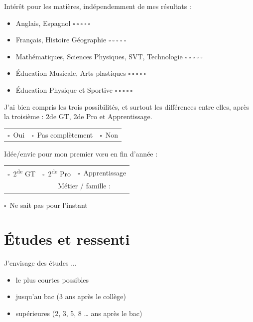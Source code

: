 \documentclass[11pt,a5paper]{article}
\newcommand{\checkbox}{\(\square\)}
\newcommand{\choix}[1]{\checkbox\ #1}
\newcommand{\ligne}{{\color{gray!60}\hrulefill}}
\begin{document}
\vspace{0.6em}
Intérêt pour les matières, indépendemment de mes résultats :

\newcommand{\avis}{\hfill \(\square\ \square\ \square\ \square\ \square\)}
\begin{itemize}[topsep=0pt]
  \item Anglais, Espagnol \avis
  \item Français, Histoire Géographie \avis
  \item Mathématiques, Sciences Physiques, SVT, Technologie \avis
  \item Éducation Musicale, Arts plastiques \avis
  \item Éducation Physique et Sportive \avis
\end{itemize}
\newpage
J'ai bien compris les trois possibilités, et surtout les différences entre elles, après la troisième : 2de GT, 2de Pro et Apprentissage.

\vspace{0.6em}
\begin{tabularx}{\textwidth}{Y Y Y}
\choix{Oui} & \choix{Pas complètement} & \choix{Non}
\end{tabularx}

\vspace{1.6em}
Idée/envie pour mon premier vœu en fin d'année :

\vspace{0.4em}
\begin{tabularx}{\textwidth}{Y | Y Y}
\choix{2\textsuperscript{de} GT} & \choix{2\textsuperscript{de} Pro} & \choix{Apprentissage}\\
[0.4em]
& \multicolumn{2}{c}{Métier / famille : \ligne }
\end{tabularx}
\begin{center}
\choix{Ne sait pas pour l'instant}
\end{center}

\section*{Études et ressenti}

J'envisage des études ...

\begin{itemize}[label=\square, topsep=0pt]
\item le plus courtes possibles
\item jusqu'au bac (3 ans après le collège)
\item supérieures (2, 3, 5, 8 … ans après le bac)
\end{itemize}
\end{document}
